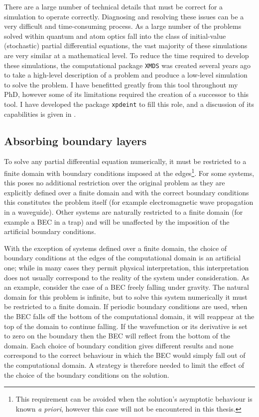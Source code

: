 There are a large number of technical details that must be correct for a simulation to operate correctly.  Diagnosing and resolving these issues can be a very difficult and time-consuming process.  As a large number of the problems solved within quantum and atom optics fall into the class of initial-value (stochastic) partial differential equations, the vast majority of these simulations are very similar at a mathematical level.  To reduce the time required to develop these simulations, the computational package \texttt{XMDS} \citep{Collecutt:2001} was created several years ago to take a high-level description of a problem and produce a low-level simulation to solve the problem.  I have benefitted greatly from this tool throughout my PhD, however some of its limitations required the creation of a successor to this tool.  I have developed the package \texttt{xpdeint} to fill this role, and a discussion of its capabilities is given in .

\subsection{Absorbing boundary layers}
\label{BackgroundTheory:AbsorbingBoundaryLayers}

To solve any partial differential equation numerically, it must be restricted to a finite domain with boundary conditions imposed at the edges\footnote{This requirement can be avoided when the solution's asymptotic behaviour is known \emph{a priori}, however this case will not be encountered in this thesis.}. For some systems, this poses no additional restriction over the original problem as they are explicitly defined over a finite domain and with the correct boundary conditions this constitutes the problem itself (for example electromagnetic wave propagation in a waveguide). Other systems are naturally restricted to a finite domain (for example a BEC in a trap) and will be unaffected by the imposition of the artificial boundary conditions. 

With the exception of systems defined over a finite domain, the choice of boundary conditions at the edges of the computational domain is an artificial one; while in many cases they permit physical interpretation, this interpretation does not usually correspond to the reality of the system under consideration. As an example, consider the case of a BEC freely falling under gravity. The natural domain for this problem is infinite, but to solve this system numerically it must be restricted to a finite domain. If periodic boundary conditions are used, when the BEC falls off the bottom of the computational domain, it will reappear at the top of the domain to continue falling. If the wavefunction or its derivative is set to zero on the boundary then the BEC will reflect from the bottom of the domain. Each choice of boundary condition gives different results and none correspond to the correct behaviour in which the BEC would simply fall out of the computational domain. A strategy is therefore needed to limit the effect of the choice of the boundary conditions on the solution.

